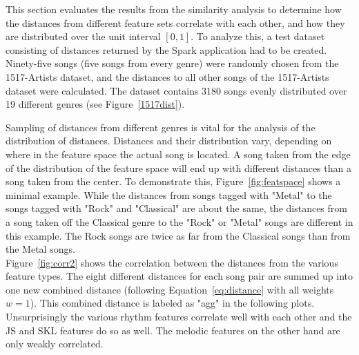 This section evaluates the results from the similarity analysis to determine how the distances from different feature sets correlate with each other, and how they are distributed over the unit interval $[0,1]$.
\noindent To analyze this, a test dataset consisting of distances returned by the Spark application had to be created. Ninety-five songs (five songs from every genre) were randomly chosen from the 1517-Artists dataset, and the distances to all other songs of the 1517-Artists dataset were calculated. The dataset contains 3180 songs evenly distributed over 19 different genres (see Figure~\ref{1517dist}).
\begin{figure}[htbp]
	\centering
\end{figure}%

\noindent Sampling of distances from different genres is vital for the analysis of the distribution of distances. Distances and their distribution vary, depending on where in the feature space the actual song is located. 
\noindent A song taken from the edge of the distribution of the feature space will end up with different distances than a song taken from the center. To demonstrate this, Figure~\ref{fig:featspace} shows a minimal example. While the distances from songs tagged with "Metal" to the songs tagged with "Rock" and "Classical" are about the same, the distances from a song taken off the Classical genre to the "Rock" or "Metal" songs are different in this example. The Rock songs are twice as far from the Classical songs than from the Metal songs.\\ 
\noindent Figure~\ref{fig:corr2} shows the correlation between the distances from the various feature types. The eight different distances for each song pair are summed up into one new combined distance (following Equation~\eqref{eq:distance} with all weights $w = 1$). This combined distance is labeled as "agg" in the following plots. Unsurprisingly the various rhythm features correlate well with each other and the JS and SKL features do so as well. The melodic features on the other hand are only weakly correlated. 

